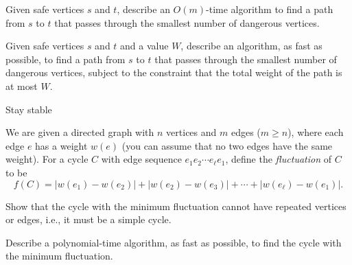 \begin{questions}[start=25]
{       \begin{questions}
           \item {} Given safe vertices $s$ and $t$, describe
           an $O(m)$-time algorithm to find a path from $s$ to $t$
           that passes through the smallest number of dangerous
           vertices.

           \item {} Given safe vertices $s$ and $t$ and a
           value $W$, describe an algorithm, as fast as possible, to
           find a path from $s$ to $t$ that passes through the
           smallest number of dangerous vertices, subject to the
           constraint that the total weight of the path is at most
           $W$.
       \end{questions}

    }{}{}{}



    \item {}%
    {Stay stable}%
    {%
       We are given a directed graph with $n$ vertices and $m$ edges
       ($m\ge n$), where each edge $e$ has a weight $w(e)$ (you can
       assume that no two edges have the same weight).  For a cycle
       $C$ with edge sequence $e_1e_2\cdots e_\ell e_1$, define the
       \emph{fluctuation} of $C$ to be
       \[
           f(C) = |w(e_1)-w(e_2)| + |w(e_2)-w(e_3)| + \cdots +
           |w(e_\ell)-w(e_1)|.
       \]

       \begin{questions}
           \item {} Show that the cycle with the minimum
           fluctuation cannot have repeated vertices or edges, i.e.,
           it must be a simple cycle.
           \item {} Describe a polynomial-time algorithm, as
           fast as possible, to find the cycle with the minimum
           fluctuation.
       \end{questions}


    }{}{}{}

\end{questions}


\HomeworkEnd{}

